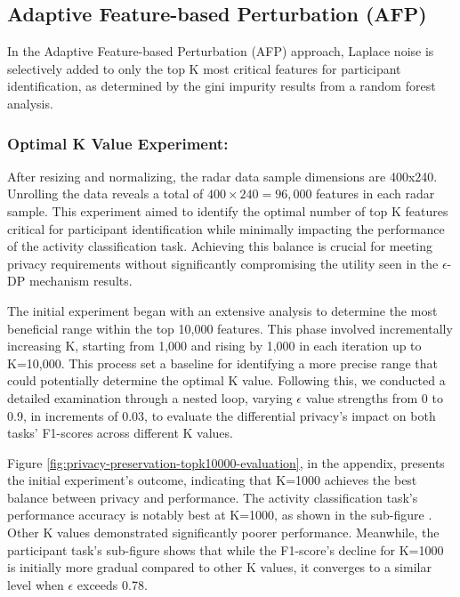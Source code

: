 \documentclass{l4proj}
\begin{document}
\subsection{Adaptive Feature-based Perturbation (AFP)}
In the Adaptive Feature-based Perturbation (AFP) approach, Laplace noise is selectively added to only the top K most critical features for participant identification, as determined by the gini impurity results from a random forest analysis. 

\subsubsection{Optimal K Value Experiment:}
After resizing and normalizing, the radar data sample dimensions are 400x240. Unrolling the data reveals a total of $400 \times 240 = 96,000$ features in each radar sample. This experiment aimed to identify the optimal number of top K features critical for participant identification while minimally impacting the performance of the activity classification task. Achieving this balance is crucial for meeting privacy requirements without significantly compromising the utility seen in the $\epsilon$-DP mechanism results.

The initial experiment began with an extensive analysis to determine the most beneficial range within the top 10,000 features. This phase involved incrementally increasing K, starting from 1,000 and rising by 1,000 in each iteration up to K=10,000. This process set a baseline for identifying a more precise range that could potentially determine the optimal K value. Following this, we conducted a detailed examination through a nested loop, varying $\epsilon$ value strengths from 0 to 0.9, in increments of 0.03, to evaluate the differential privacy's impact on both tasks' F1-scores across different K values.

Figure \ref{fig:privacy-preservation-topk10000-evaluation}, in the appendix, presents the initial experiment's outcome, indicating that K=1000 achieves the best balance between privacy and performance. The activity classification task's performance accuracy is notably best at K=1000, as shown in the sub-figure . Other K values demonstrated significantly poorer performance. Meanwhile, the participant task's sub-figure  shows that while the F1-score's decline for K=1000 is initially more gradual compared to other K values, it converges to a similar level when $\epsilon$ exceeds 0.78.
\end{document}
